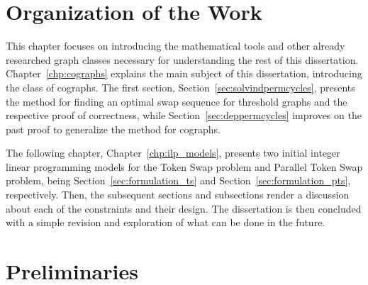 \documentclass[msc,english,table,xcdraw]{ppgccufmg}
\begin{document}
\section{Organization of the Work}
\label{sec:intro:organi}

This chapter focuses on introducing the mathematical tools and other 
already researched graph classes necessary for understanding the rest of this 
dissertation.
Chapter~\ref{chp:cographs} explains the main subject of this dissertation,
introducing the class of cographs.
The first section, Section~\ref{sec:solvindpermcycles}, presents the method 
for finding an optimal swap sequence for threshold graphs and the respective proof
of correctness, while Section~\ref{sec:deppermcycles} improves on the past 
proof to generalize the method for cographs.

The following chapter, Chapter~\ref{chp:ilp_models}, presents two initial integer 
linear programming models for the Token Swap problem and Parallel Token
Swap problem, being Section~\ref{sec:formulation_ts} and Section~\ref{sec:formulation_pts},
respectively.
Then, the subsequent sections and subsections render a discussion about each of 
the constraints and their design.
The dissertation is then concluded with a simple revision and exploration of 
what can be done in the future.

\section{Preliminaries}
\label{sec:intro:prelim}
\end{document}
